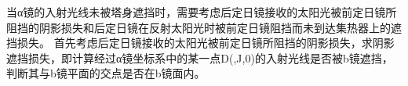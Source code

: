 当α镜的入射光线未被塔身遮挡时，需要考虑后定日镜接收的太阳光被前定日镜所阻挡的阴影损失和后定日镜在反射太阳光时被前定日镜阻挡而未到达集热器上的遮挡损失。
首先考虑后定日镜接收的太阳光被前定日镜所阻挡的阴影损失，求阴影遮挡损失，即计算经过α镜坐标系中的某一点D(,J,0)的入射光线是否被b镜遮挡，判断其与b镜平面的交点是否在b镜面内。
